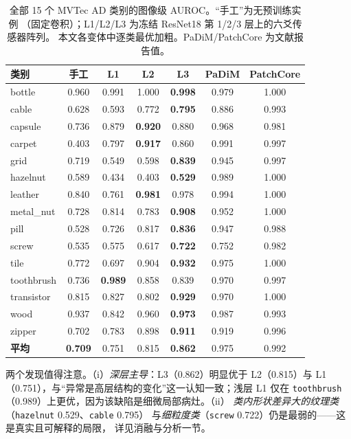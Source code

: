 \documentclass[journal,10pt]{IEEEtran}
\begin{document}
\begin{table}[t]
\centering
\caption{全部 15 个 MVTec AD 类别的图像级 AUROC。“手工”为无预训练实例
（固定卷积）；L1/L2/L3 为冻结 ResNet18 第 1/2/3 层上的六爻传感器阵列。
本文各变体中逐类最优加粗。PaDiM/PatchCore 为文献报告值。}
\label{tab:main}
\small
\begin{tabular}{lcccccc}
\toprule
类别 & 手工 & L1 & L2 & \textbf{L3} & PaDiM & PatchCore \\
\midrule
bottle     & 0.960 & 0.991 & 1.000 & \textbf{0.998} & 0.979 & 1.000 \\
cable      & 0.628 & 0.593 & 0.772 & \textbf{0.795} & 0.886 & 0.993 \\
capsule    & 0.736 & 0.879 & \textbf{0.920} & 0.880 & 0.968 & 0.981 \\
carpet     & 0.403 & 0.797 & \textbf{0.917} & 0.860 & 0.991 & 0.997 \\
grid       & 0.719 & 0.549 & 0.598 & \textbf{0.839} & 0.945 & 0.997 \\
hazelnut   & 0.589 & 0.434 & 0.403 & \textbf{0.529} & 0.989 & 1.000 \\
leather    & 0.840 & 0.761 & \textbf{0.981} & 0.978 & 0.994 & 1.000 \\
metal\_nut & 0.728 & 0.814 & 0.783 & \textbf{0.908} & 0.952 & 1.000 \\
pill       & 0.528 & 0.726 & 0.817 & \textbf{0.836} & 0.947 & 0.988 \\
screw      & 0.535 & 0.575 & 0.617 & \textbf{0.722} & 0.752 & 0.982 \\
tile       & 0.772 & 0.697 & 0.904 & \textbf{0.932} & 0.975 & 1.000 \\
toothbrush & 0.736 & \textbf{0.989} & 0.858 & 0.839 & 0.970 & 0.997 \\
transistor & 0.815 & 0.827 & 0.802 & \textbf{0.929} & 0.970 & 1.000 \\
wood       & 0.937 & 0.842 & 0.960 & \textbf{0.973} & 0.987 & 0.993 \\
zipper     & 0.702 & 0.783 & 0.898 & \textbf{0.911} & 0.919 & 0.996 \\
\midrule
\textbf{平均} & \textbf{0.709} & 0.751 & 0.815 & \textbf{0.862} & 0.975 & 0.992 \\
\bottomrule
\end{tabular}
\end{table}

两个发现值得注意。（i）\emph{深层主导}：L3（0.862）明显优于 L2（0.815）与
L1（0.751），与“异常是高层结构的变化”这一认知一致；浅层 L1 仅在
\texttt{toothbrush}（0.989）上更优，因为该缺陷是细微局部病灶。（ii）
\emph{类内形状差异大的纹理类}（\texttt{hazelnut} 0.529、\texttt{cable} 0.795）
与\emph{细粒度类}（\texttt{screw} 0.722）仍是最弱的——这是真实且可解释的局限，
详见消融与分析一节。
\end{document}
